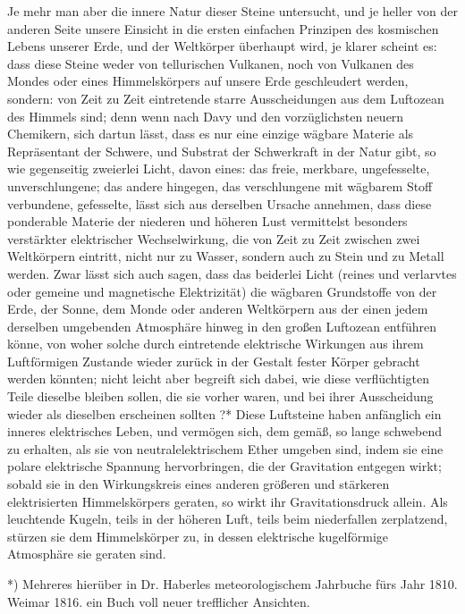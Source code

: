 \documentclass[a4paper, 11pt, oneside, polutonikogreek, german]{article}
\begin{document}
Je mehr man aber die innere Natur dieser Steine untersucht, und je heller von der anderen Seite unsere Einsicht in die ersten einfachen Prinzipen des kosmischen Lebens unserer Erde, und der Weltkörper überhaupt wird, je klarer scheint es: dass diese Steine weder von tellurischen Vulkanen, noch von Vulkanen des Mondes oder eines Himmelskörpers auf unsere Erde geschleudert werden, sondern: von Zeit zu Zeit eintretende starre Ausscheidungen aus dem Luftozean des Himmels sind; denn wenn nach Davy und den vorzüglichsten neuern Chemikern, sich dartun lässt, dass es nur eine einzige wägbare Materie als Repräsentant der Schwere, und Substrat der Schwerkraft in der Natur gibt, so wie gegenseitig zweierlei Licht, davon eines: das freie, merkbare, ungefesselte, unverschlungene; das andere hingegen, das verschlungene mit wägbarem Stoff verbundene, gefesselte, lässt sich aus derselben Ursache annehmen, dass diese ponderable Materie der niederen und höheren Lust vermittelst besonders verstärkter elektrischer Wechselwirkung, die von Zeit zu Zeit zwischen zwei Weltkörpern eintritt, nicht nur zu Wasser, sondern auch zu Stein und zu Metall werden. Zwar lässt sich auch sagen, dass das beiderlei Licht (reines und verlarvtes oder gemeine und magnetische Elektrizität) die wägbaren Grundstoffe von der Erde, der Sonne, dem Monde oder anderen Weltkörpern aus der einen jedem derselben umgebenden Atmosphäre hinweg in den großen Luftozean entführen könne, von woher solche durch eintretende elektrische Wirkungen aus ihrem Luftförmigen Zustande wieder zurück in der Gestalt fester Körper gebracht werden könnten; nicht leicht aber begreift sich dabei, wie diese verflüchtigten Teile dieselbe bleiben sollen, die sie vorher waren, und bei ihrer Ausscheidung wieder als dieselben erscheinen sollten ?* Diese Luftsteine haben anfänglich ein inneres elektrisches Leben, und vermögen sich, dem gemäß, so lange schwebend zu erhalten, als sie von neutralelektrischem Ether umgeben sind, indem sie eine polare elektrische Spannung hervorbringen, die der Gravitation entgegen wirkt; sobald sie in den Wirkungskreis eines anderen größeren und stärkeren elektrisierten Himmelskörpers geraten, so wirkt ihr Gravitationsdruck allein. Als leuchtende Kugeln, teils in der höheren Luft, teils beim niederfallen zerplatzend, stürzen sie dem Himmelskörper zu, in dessen elektrische kugelförmige Atmosphäre sie geraten sind.

*) Mehreres hierüber in Dr. Haberles meteorologischem Jahrbuche fürs Jahr 1810. Weimar 1816. ein Buch voll neuer trefflicher Ansichten.
\end{document}
